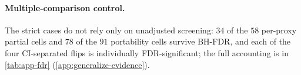 \paragraph{Multiple-comparison control.}
The strict cases do not rely only on unadjusted screening: $34$ of the $58$
per-proxy partial cells and $78$ of the $91$ portability cells survive BH-FDR,
and each of the four CI-separated
flips is individually FDR-significant; the full accounting is in \cref{tab:app-fdr}
(\cref{app:generalize-evidence}).
